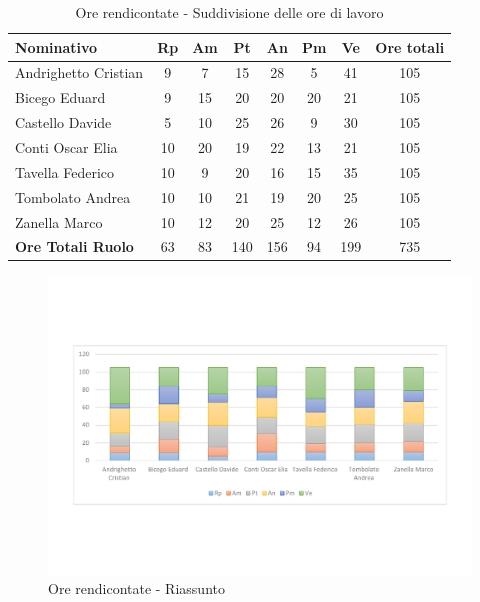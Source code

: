 \documentclass[../PianoProgetto.tex]{subfiles}
\begin{document}
	\begin{table}[h]
		\begin{tabularx}{\textwidth}{l  * {6}{C}  c}
			\toprule
			\textbf{Nominativo} & \textbf{Rp} & \textbf{Am} & \textbf{Pt} 
						& \textbf{An} & \textbf{Pm} & \textbf{Ve} & \textbf{Ore totali} \\
			\midrule
			Andrighetto Cristian & 9 & 7 & 15 & 28 & 5 & 41 &	105 \\
			Bicego Eduard & 9 & 15 & 20 & 20 & 20 & 21 & 105 \\
			Castello Davide & 5 & 10 & 25 & 26 & 9 & 30 & 105 \\
			Conti Oscar Elia & 10 & 20 & 19 & 22 & 13 & 21 & 105 \\
			Tavella Federico &	10 & 9 & 20 & 16 & 15 & 35 & 105 \\
			Tombolato Andrea & 10 & 10 & 21 & 19 & 20 & 25 & 105 \\
			Zanella Marco & 10 & 12 & 20 & 25 & 12 & 26 & 105 \\
			\midrule			
			\textbf{Ore Totali Ruolo} & 63 & 83 & 140 & 156 & 94 & 199 & 735 \\
			\bottomrule
		\end{tabularx}
		\caption{Ore rendicontate - Suddivisione delle ore di lavoro}
		\label{tab:rendicontate_ore}
	\end{table}
	
\newpage
\vfill		
	
	\begin{figure}[!h]
		\centering
		\includegraphics[width=\textwidth , trim=2cm 5cm 2cm 5cm]{grafici/Riepilogo/Rendicontate/ore-persona}
			\caption{Ore rendicontate - Riassunto}
		\label{fig:BarChart-rendicontate_ore}
	\end{figure}
	
\end{document}
